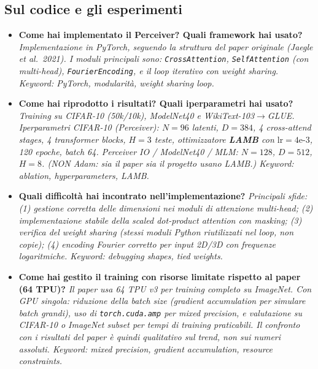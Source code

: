\documentclass[
  11pt,
]{article}
\begin{document}
\subsection{Sul codice e gli esperimenti}

\begin{itemize}

  \item \textbf{Come hai implementato il Perceiver? Quali framework hai usato?}
  \textit{Implementazione in PyTorch, seguendo la struttura del paper originale (Jaegle et al.\ 2021). I moduli principali sono: \texttt{CrossAttention}, \texttt{SelfAttention} (con multi-head), \texttt{FourierEncoding}, e il loop iterativo con weight sharing. Keyword: PyTorch, modularità, weight sharing loop.}

  \item \textbf{Come hai riprodotto i risultati? Quali iperparametri hai usato?}
  \textit{Training su CIFAR-10 (50k/10k), ModelNet40 e WikiText-103$\to$GLUE. Iperparametri CIFAR-10 (Perceiver): $N=96$ latenti, $D=384$, 4 cross-attend stages, 4 transformer blocks, $H=3$ teste, ottimizzatore \textbf{LAMB} con $\text{lr}=4\text{e-}3$, 120 epoche, batch 64. Perceiver IO / ModelNet40 / MLM: $N=128$, $D=512$, $H=8$. (NON Adam: sia il paper sia il progetto usano LAMB.) Keyword: ablation, hyperparameters, LAMB.}

  \item \textbf{Quali difficoltà hai incontrato nell'implementazione?}
  \textit{Principali sfide: (1) gestione corretta delle dimensioni nei moduli di attenzione multi-head; (2) implementazione stabile della scaled dot-product attention con masking; (3) verifica del weight sharing (stessi moduli Python riutilizzati nel loop, non copie); (4) encoding Fourier corretto per input 2D/3D con frequenze logaritmiche. Keyword: debugging shapes, tied weights.}

  \item \textbf{Come hai gestito il training con risorse limitate rispetto al paper (64 TPU)?}
  \textit{Il paper usa 64 TPU v3 per training completo su ImageNet. Con GPU singola: riduzione della batch size (gradient accumulation per simulare batch grandi), uso di \texttt{torch.cuda.amp} per mixed precision, e valutazione su CIFAR-10 o ImageNet subset per tempi di training praticabili. Il confronto con i risultati del paper è quindi qualitativo sul trend, non sui numeri assoluti. Keyword: mixed precision, gradient accumulation, resource constraints.}

\end{itemize}
\end{document}
